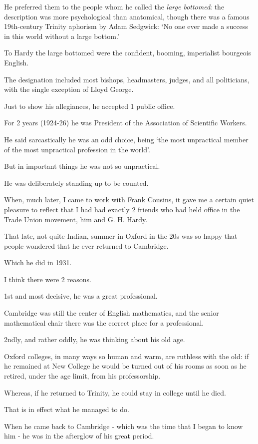 \documentclass{article}
\numberwithin{equation}{section}
\begin{document}
He preferred them to the people whom he called the \textit{large bottomed}: the description was more psychological than anatomical, though there was a famous 19th-century Trinity aphorism by Adam Sedgwick: `No one ever made a success in this world without a large bottom.'

To Hardy the large bottomed were the confident, booming, imperialist bourgeois English.

The designation included most bishops, headmasters, judges, and all politicians, with the single exception of Lloyd George.

%
Just to show his allegiances, he accepted 1 public office.

For 2 years (1924-26) he was President of the Association of Scientific Workers.

He said sarcastically he was an odd choice, being `the most unpractical member of the most unpractical profession in the world'.

But in important things he was not so unpractical.

He was deliberately standing up to be counted.

When, much later, I came to work with Frank Cousins, it gave me a certain quiet pleasure to reflect that I had had exactly 2 friends who had held office in the Trade Union movement, him and G. H. Hardy.

%
That late, not quite Indian, summer in Oxford in the 20s was so happy that people wondered that he ever returned to Cambridge.

Which he did  in 1931.

I think there were 2 reasons.

1st and most decisive, he was a great professional.

Cambridge was still the center of English mathematics, and the senior mathematical chair there was the correct place for a professional.

2ndly, and rather oddly, he was thinking about his old age.

Oxford colleges, in many ways so human and warm, are ruthless with the old: if he remained at New College he would be turned out of his rooms as soon as he retired, under the age limit, from his professorship.

Whereas, if he returned to Trinity, he could stay in college until he died.

That is in effect what he managed to do.

%
When he came back to Cambridge - which was the time that I began to know him - he was in the afterglow of his great period.
\end{document}

